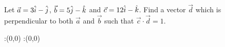 


\question[2] Let $\vec{a}=3\hat{i}-\hat{j}$, $\vec{b}=5\hat{j}-\hat{k}$ 
and $\vec{c}=12\hat{i}-\hat{k}$. Find a vector $\vec{d}$ which is perpendicular
to both $\vec{a}$ and $\vec{b}$ such that $\vec{c}\cdot\vec{d}=1$.

\insertQR{}

\watchout

\ifprintanswers
  \begin{marginfigure}
      :(0,0)
      :(0,0)
    \figdrawbegin{}
      \figdrawline [100,101]
    \figdrawend
    \figvisu{\figBoxA}{}{%
    }
    \centerline{\box\figBoxA}
  \end{marginfigure}
\fi 

